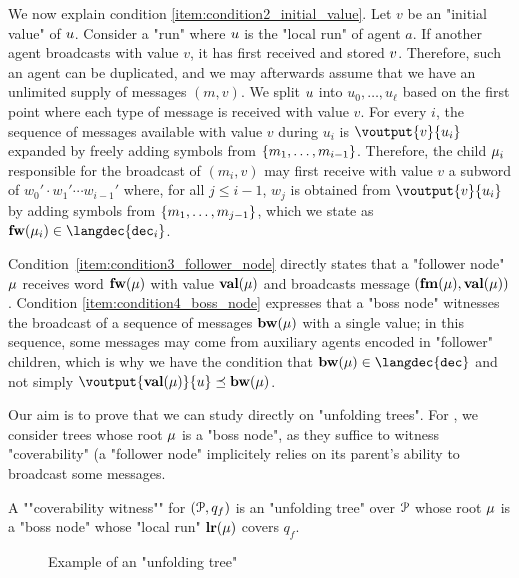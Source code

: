 We now explain condition \ref{item:condition2_initial_value}. Let $v$ be an "initial value" of $u$. Consider a "run" where $u$ is the "local run" of agent $a$. If another agent broadcasts with value $v$, it has first received and stored $v$. Therefore, such an agent can be duplicated, and we may afterwards assume that we have an unlimited supply of messages $(m,v)$.
We split $u$ into $u_0,\dots,u_\ell$ based on the first point where each type of message is received with value $v$. For every $i$, the sequence of messages available with value $v$ during $u_i$ is $\voutput{v}{u_i}$ expanded by freely adding symbols from $\{m_1,\dots, m_{i-1}\}$. Therefore, the child $\mu_i$ responsible for the broadcast of $(m_i,v)$ may first receive with value $v$ a subword of $w_0' \cdot w_1' \cdots w_{i-1}'$ where, for all $j \leq i-1$, $w_j$ is obtained from $\voutput{v}{u_i}$ by adding symbols from $\{m_1, \dots, m_{j-1}\}$, which we state as $\followlabelword{\node_i} \in \langdec{\decsymb_i}$.   

Condition~\ref{item:condition3_follower_node} directly states that a "follower node" $\mu$ receives word $\mathbf{fw}(\mu)$ with value $\mathbf{val}(\mu)$ and broadcasts message $(\mathbf{fm}(\mu), \mathbf{val}(\mu))$. Condition \ref{item:condition4_boss_node} expresses that a "boss node" witnesses the broadcast of a sequence of messages $\mathbf{bw}(\mu)$ with a single value; in this sequence, some messages may come from auxiliary agents encoded in "follower" children, which is why we have the condition that $\bosslabel{\node} \in \langdec{\decsymb}$ and not simply $ \voutput{\valuelabel{\node}}{\localrun} \subword \bosslabel{\node}$. 

Our aim is to prove that we can study \COVER directly on "unfolding trees". For \COVER, we consider trees whose root $\mu$ is a "boss node", as they suffice to witness "coverability" (a "follower node" implicitely relies on its parent's ability to broadcast some messages. 

\begin{definition}
\label{def:cov_witness}
A ""coverability witness"" for $(\mathcal{P}, q_f)$ is an "unfolding tree" over $\mathcal{P}$ whose root $\mu$ is a "boss node" whose "local run" $\mathbf{lr}(\mu)$ covers $q_f$. 
\end{definition}

\begin{figure}
	\begin{center}
	\resizebox{\textwidth}{!}{
		
	}
	\end{center}
	\caption{Example of an "unfolding tree"}\label{fig-ex-unfolding-tree}
\end{figure}

